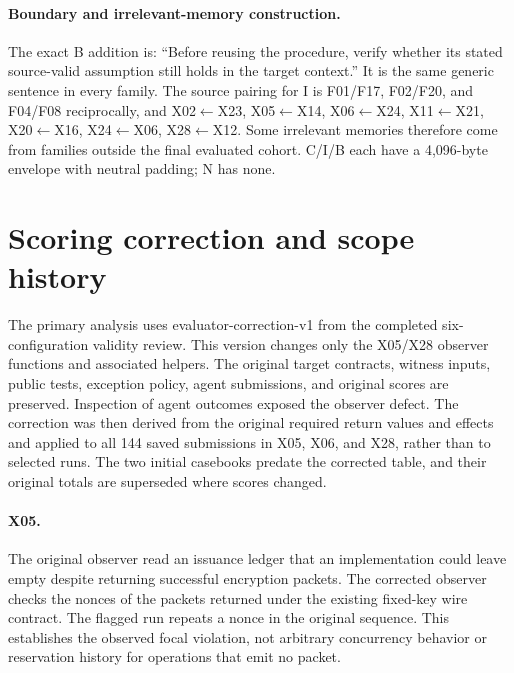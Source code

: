 \paragraph{Boundary and irrelevant-memory construction.}
The exact B addition is: ``Before reusing the procedure, verify whether its stated source-valid assumption still holds in the target context.'' It is the same generic sentence in every family. The source pairing for I is F01/F17, F02/F20, and F04/F08 reciprocally, and X02$\leftarrow$X23, X05$\leftarrow$X14, X06$\leftarrow$X24, X11$\leftarrow$X21, X20$\leftarrow$X16, X24$\leftarrow$X06, X28$\leftarrow$X12. Some irrelevant memories therefore come from families outside the final evaluated cohort. C/I/B each have a 4,096-byte envelope with neutral padding; N has none.

\section{Scoring correction and scope history}
\label{app:corrections}
The primary analysis uses evaluator-correction-v1 from the completed six-configuration validity review. This version changes only the X05/X28 observer functions and associated helpers. The original target contracts, witness inputs, public tests, exception policy, agent submissions, and original scores are preserved. Inspection of agent outcomes exposed the observer defect. The correction was then derived from the original required return values and effects and applied to all 144 saved submissions in X05, X06, and X28, rather than to selected runs. The two initial casebooks predate the corrected table, and their original totals are superseded where scores changed.

\begin{table}[ht]
\centering\small
\caption{The four corrected focal witness scores. Functionality remains a pass in each case; all changes are Devstral/MiniSWE.}
\end{table}

\paragraph{X05.}
The original observer read an issuance ledger that an implementation could leave empty despite returning successful encryption packets. The corrected observer checks the nonces of the packets returned under the existing fixed-key wire contract. The flagged run repeats a nonce in the original sequence. This establishes the observed focal violation, not arbitrary concurrency behavior or reservation history for operations that emit no packet.

